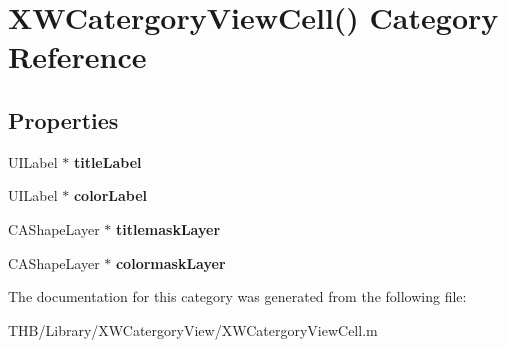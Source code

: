 \hypertarget{category_x_w_catergory_view_cell_07_08}{}\section{X\+W\+Catergory\+View\+Cell() Category Reference}
\label{category_x_w_catergory_view_cell_07_08}
\subsection*{Properties}
\begin{DoxyCompactItemize}
\item 
\mbox{\label{category_x_w_catergory_view_cell_07_08_ac4d330decdfabef12a6715a03da4e0f3}} 
U\+I\+Label $\ast$ {\bfseries title\+Label}
\item 
\mbox{\label{category_x_w_catergory_view_cell_07_08_aaff1a1b3578f1545aa7cf84762cfa7f1}} 
U\+I\+Label $\ast$ {\bfseries color\+Label}
\item 
\mbox{\label{category_x_w_catergory_view_cell_07_08_a66da8d0d5c00df88c69258f68a64af31}} 
C\+A\+Shape\+Layer $\ast$ {\bfseries titlemask\+Layer}
\item 
\mbox{\label{category_x_w_catergory_view_cell_07_08_a64d7a835d76da3b5addc3af852686c10}} 
C\+A\+Shape\+Layer $\ast$ {\bfseries colormask\+Layer}
\end{DoxyCompactItemize}


The documentation for this category was generated from the following file\+:\begin{DoxyCompactItemize}
\item 
T\+H\+B/\+Library/\+X\+W\+Catergory\+View/X\+W\+Catergory\+View\+Cell.\+m\end{DoxyCompactItemize}
